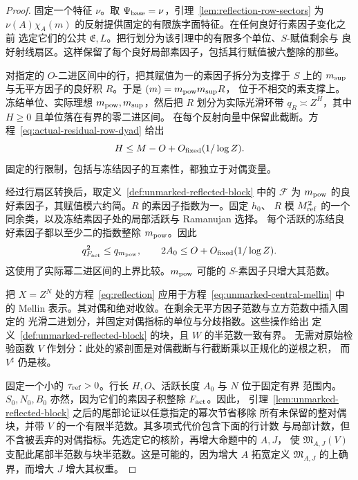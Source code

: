 \begin{proof}
固定一个特征 $\nu$。取 $\Psi_{\rm base}=\nu$，引理~\ref{lem:reflection-row-sectors}
为 $\nu(A)\chi_A(m)$ 的反射提供固定的有限族字面特征。在任何良好行素因子变化之前
选定它们的公共 $\mathfrak E,L$。把行划分为该引理中的有限多个单位、$S$-赋值剩余与
良好射线扇区。这样保留了每个良好局部素因子，包括其行赋值被六整除的那些。

对指定的 $O$-二进区间中的行，把其赋值为一的素因子拆分为支撑于 $S$ 上的
$m_{\rm sup}$ 与无平方因子的良好积 $R$。于是 $(m)=m_{\rm pow}m_{\rm sup}R$，
位于不相交的素支撑上。冻结单位、实际理想 $m_{\rm pow},m_{\rm sup}$，然后把 $R$
划分为实际光滑环带 $q_R\asymp Z^H$，其中 $H\ge0$ 且单位落在有界的零二进区间。
在每个反射向量中保留此截断。方程~\eqref{eq:actual-residual-row-dyad} 给出
\begin{equation}\label{eq:unmarked-row-width}
 H\le M-O+O_{\rm fixed}(1/\log Z).
\end{equation}
固定的行限制，包括与冻结因子的互素性，都独立于对偶变量。

经过行扇区转换后，取定义~\ref{def:unmarked-reflected-block} 中的 $\mathcal F$
为 $m_{\rm pow}$ 的良好素因子，其赋值模六约简。$R$ 的素因子指数为一。固定 $h_0$、
$R$ 模 $M_{\rm ref}^2$ 的一个同余类，以及冻结素因子处的局部活跃与 Ramanujan 选择。
每个活跃的冻结良好素因子都以至少二的指数整除 $m_{\rm pow}$。因此
\begin{equation}\label{eq:unmarked-powerful-radical}
 q_{F_{\rm act}}^2\le q_{m_{\rm pow}},\qquad
 2A_0\le O+O_{\rm fixed}(1/\log Z).
\end{equation}
这使用了实际幂二进区间的上界比较。$m_{\rm pow}$ 可能的 $S$-素因子只增大其范数。

把 $X=Z^N$ 处的方程~\eqref{eq:reflection} 应用于方程~\eqref{eq:unmarked-central-mellin}
中的 Mellin 表示。其对偶和绝对收敛。在剩余无平方因子范数与立方范数中插入固定的
光滑二进划分，并固定对偶指标的单位与分歧指数。这些操作给出
定义~\ref{def:unmarked-reflected-block} 的块，且 $W$ 的半范数一致有界。
无需对原始检验函数 $V$ 作划分：此处的紧剖面是对偶截断与行截断乘以正规化的逆根之积，
而 $V^\sharp$ 仍是核。

固定一个小的 $\tau_{\rm ref}>0$。行长 $H,O$、活跃长度 $A_0$ 与 $N$ 位于固定有界
范围内。$S_0,N_0,B_0$ 亦然，因为它们的素因子积整除 $F_{\rm act}$。因此，
引理~\ref{lem:unmarked-reflected-block} 之后的尾部论证以任意指定的幂次节省移除
所有未保留的整对偶块，并带 $V$ 的一个有限半范数。其多项式代价包含下面的行计数
与局部计数，但不含被丢弃的对偶指标。先选定它的核阶，再增大命题中的 $A,J$，
使 $\mathfrak M_{A,J}(V)$ 支配此尾部半范数与块半范数。这是可能的，因为增大 $A$
拓宽定义 $\mathfrak M_{A,J}$ 的上确界，而增大 $J$ 增大其权重。


\end{proof}
